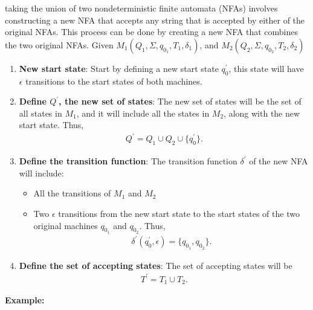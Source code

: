\documentclass{report}
\begin{document}
\begin{itemize}
        taking the union of two nondeterministic finite automata (NFAs) involves constructing a new NFA that accepts any string that is accepted by either of the original NFAs. This process can be done by creating a new NFA that combines the two original NFAs. 
        \bigbreak \noindent 
        Given $M_{1}(Q_{1}, \Sigma, q_{0_{1}}, T_{1}, \delta_{1}) $, and $M_{2}(Q_{2}, \Sigma, q_{0_{2}}, T_{2}, \delta_{2}) $
        \bigbreak \noindent 
        \begin{enumerate}
            \item \textbf{New start state}: Start by defining a new start state $q^{\prime}_{0}$, this state will have $\epsilon$ transitions to the start states of both machines.
            \item \textbf{Define $Q^{\prime}$, the new set of states}: The new set of states will be the set of all states in $M_1$, and it will include all the states in $M_2$, along with the new start state. Thus,
                \begin{align*}
                    Q^{\prime} = Q_{1} \cup Q_{2} \cup \{q^{\prime}_{0}\}
                .\end{align*}
            \item \textbf{Define the transition function}: The transition function $\delta^{\prime}$ of the new NFA will include:
                \begin{itemize}
                    \item All the transitions of $M_{1}$ and $M_{2}$
                    \item Two $\epsilon$ transitions from the new start state to the start states of the two original machines $q_{0_{1}}$ and $q_{0_{2}}$. Thus,
                        \begin{align*}
                            \delta^{\prime}(q_{0}^{\prime}, \epsilon) = \{q_{0_{1}}, q_{0_{2}}\}
                        .\end{align*}
                \end{itemize}
            \item \textbf{Define the set of accepting states}: The set of accepting states will be
                \begin{align*}
                    T^{\prime} = T_{1} \cup T_{2}
                .\end{align*}
        \end{enumerate}
        \pagebreak \bigbreak \noindent 
        \textbf{Example:}
        \begin{figure}[ht]

\end{figure}
\end{itemize}
\end{document}
